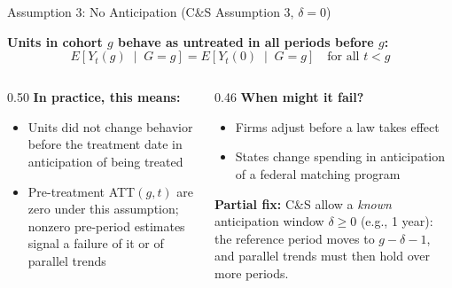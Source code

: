 \documentclass[main.tex]{subfiles}
\begin{document}
\begin{frame}{Assumption 3: No Anticipation (C\&S Assumption 3, $\delta=0$)}

  \textbf{Units in cohort $g$ behave as untreated in all periods
  before $g$:}
  \[
    E\!\left[Y_t(g)\;\middle|\;G=g\right]
    = E\!\left[Y_t(0)\;\middle|\;G=g\right]
    \quad \text{for all } t < g
  \]

  \bigskip
  \begin{columns}[T]
    \begin{column}{0.50\textwidth}
      \textbf{In practice, this means:}
      \begin{itemize}
        \item Units did not change behavior before the treatment
          date in anticipation of being treated
        \item Pre-treatment ATT$(g,t)$ are zero under this assumption;
          nonzero pre-period estimates signal a failure of it or of
          parallel trends
      \end{itemize}
    \end{column}
    \begin{column}{0.46\textwidth}
      \textbf{When might it fail?}
      \begin{itemize}
        \item Firms adjust before a law takes effect
        \item States change spending in anticipation of a federal
          matching program
      \end{itemize}

      \medskip
      \textbf{Partial fix:} C\&S allow a \emph{known} anticipation
      window $\delta \geq 0$ (e.g., 1 year): the reference period
      moves to $g-\delta-1$, and parallel trends must then hold over
      more periods.
    \end{column}
  \end{columns}

\end{frame}
\end{document}
